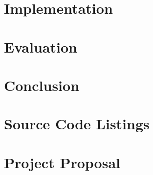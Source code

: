 \documentclass[a4paper,12pt,twoside,openright]{report}
\begin{document}
\chapter{Implementation}
\label{ch:implementation}


\chapter{Evaluation}
\label{ch:evaluation}


\chapter{Conclusion}
\label{ch:conclusion}



\printbibliography

\appendix

% 

\chapter{Source Code Listings}
\label{ch:appendix-code}


\chapter{Project Proposal}

\end{document}
